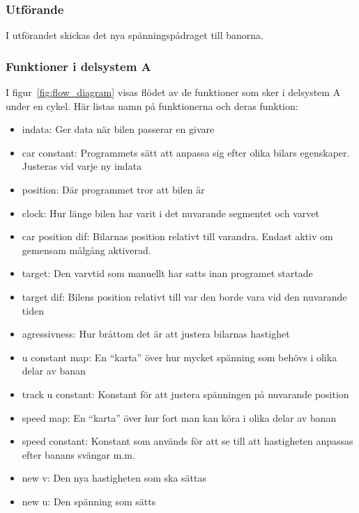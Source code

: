     \subsubsection{Utförande}

    	I utförandet skickas det nya spänningspådraget till banorna. 
	

    \subsubsection{Funktioner i delsystem A}
	I figur~\ref{fig:flow_diagram}  visas flödet av de funktioner som sker i delsystem A under en cykel.
	Här listas namn på funktionerna och deras funktion:
	\begin{itemize}
 		\item indata: Ger data när bilen passerar en givare
		\item car constant: Programmets sätt att anpassa sig efter olika bilars egenskaper. Justeras vid varje ny indata
 		\item position: Där programmet tror att bilen är
 		\item clock: Hur länge bilen har varit i det nuvarande segmentet och varvet
		\item car position dif: Bilarnas position relativt till varandra. Endast aktiv om gemensam målgång aktiverad.
		\item target: Den varvtid som manuellt har satts inan programet startade
		\item target dif: Bilens position relativt till var den borde vara vid den nuvarande tiden
		\item agressivness: Hur bråttom det är att justera bilarnas hastighet 
		\item u constant map: En ``karta'' över hur mycket spänning som behövs i olika delar av banan
		\item track u constant: Konstant för att justera spänningen på nuvarande position
		\item speed map: En ``karta'' över hur fort man kan köra i olika delar av banan		
		\item speed constant: Konstant som används för att se till att hastigheten anpassas efter banans svängar m.m.
		\item new v: Den nya hastigheten som ska sättas
		\item new u: Den spänning som sätts
	\end{itemize}

